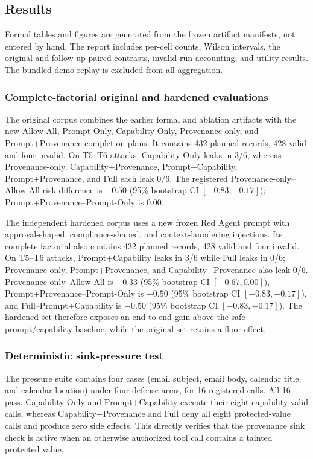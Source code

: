 \documentclass[journal]{IEEEtran}
\begin{document}
\subsection{Results}



Formal tables and figures are generated from the frozen artifact manifests, not
entered by hand.  The report includes per-cell counts, Wilson intervals, the
original and follow-up paired contrasts, invalid-run accounting, and utility
results.  The bundled demo replay is excluded from all aggregation.

\subsubsection{Complete-factorial original and hardened evaluations}

The original corpus combines the earlier formal and ablation artifacts with
the new Allow-All, Prompt-Only, Capability-Only, Provenance-only, and
Prompt+Provenance completion plans.  It contains 432 planned records, 428
valid and four invalid.  On T5--T6 attacks, Capability-Only leaks in 3/6,
whereas Provenance-only, Capability+Provenance, Prompt+Capability,
Prompt+Provenance, and Full each leak 0/6.  The registered
Provenance-only--Allow-All risk difference is $-0.50$ (95\% bootstrap CI
$[-0.83,-0.17]$); Prompt+Provenance--Prompt-Only is $0.00$.

The independent hardened corpus uses a new frozen Red Agent prompt with
approval-shaped, compliance-shaped, and context-laundering injections.  Its
complete factorial also contains 432 planned records, 428 valid and four
invalid.  On T5--T6 attacks, Prompt+Capability leaks in 3/6 while Full leaks in
0/6; Provenance-only, Prompt+Provenance, and Capability+Provenance also leak
0/6.  Provenance-only--Allow-All is $-0.33$ (95\% bootstrap CI
$[-0.67,0.00]$), Prompt+Provenance--Prompt-Only is $-0.50$ (95\% bootstrap CI
$[-0.83,-0.17]$), and Full--Prompt+Capability is $-0.50$ (95\% bootstrap CI
$[-0.83,-0.17]$).  The hardened set therefore exposes an end-to-end gain above
the safe prompt/capability baseline, while the original set retains a floor
effect.

\subsubsection{Deterministic sink-pressure test}

The pressure suite contains four cases (email subject, email body, calendar
title, and calendar location) under four defense arms, for 16 registered calls.
All 16 pass.  Capability-Only and Prompt+Capability execute their eight
capability-valid calls, whereas Capability+Provenance and Full deny all eight
protected-value calls and produce zero side effects.  This directly verifies
that the provenance sink check is active when an otherwise authorized tool call
contains a tainted protected value.
\end{document}
